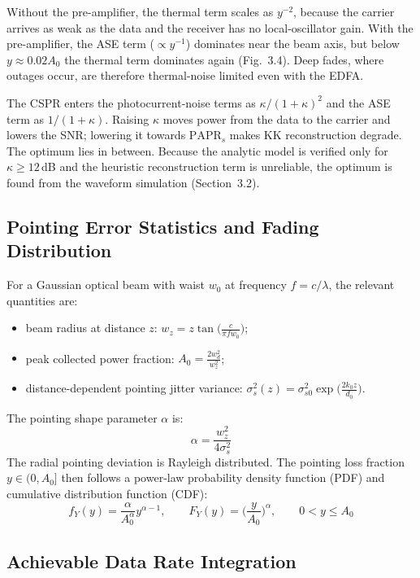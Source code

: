 Without the pre-amplifier, the thermal term scales as $y^{-2}$, because the carrier arrives as weak as the data and the receiver has no local-oscillator gain. With the pre-amplifier, the ASE term ($\propto y^{-1}$) dominates near the beam axis, but below $y\approx0.02A_0$ the thermal term dominates again (Fig.~3.4). Deep fades, where outages occur, are therefore thermal-noise limited even with the EDFA.

The CSPR enters the photocurrent-noise terms as $\kappa/(1+\kappa)^2$ and the ASE term as $1/(1+\kappa)$. Raising $\kappa$ moves power from the data to the carrier and lowers the SNR; lowering it towards $\mathrm{PAPR}_s$ makes KK reconstruction degrade. The optimum lies in between. Because the analytic model is verified only for $\kappa\ge12$\,dB and the heuristic reconstruction term is unreliable, the optimum is found from the waveform simulation (Section~3.2).

\subsection{Pointing Error Statistics and Fading Distribution}

For a Gaussian optical beam with waist $w_0$ at frequency $f=c/\lambda$, the relevant quantities are:
\begin{itemize}
\item beam radius at distance $z$: $w_z=z\tan\!\big(\tfrac{c}{\pi fw_0}\big)$;
\item peak collected power fraction: $A_0=\frac{2w_d^2}{w_z^2}$;
\item distance-dependent pointing jitter variance: $\sigma_s^2(z)=\sigma_{s0}^2\exp\!\big(\tfrac{2k_0z}{d_0}\big)$.
\end{itemize}
The pointing shape parameter $\alpha$ is:
\begin{equation}
\alpha=\frac{w_z^2}{4\sigma_s^2}
\end{equation}
The radial pointing deviation is Rayleigh distributed. The pointing loss fraction $y\in(0,A_0]$ then follows a power-law probability density function (PDF) and cumulative distribution function (CDF):
\begin{equation}
f_Y(y)=\frac{\alpha}{A_0^\alpha}y^{\alpha-1},\qquad F_Y(y)=\Big(\frac{y}{A_0}\Big)^{\alpha},\qquad 0<y\le A_0
\end{equation}

\subsection{Achievable Data Rate Integration}

